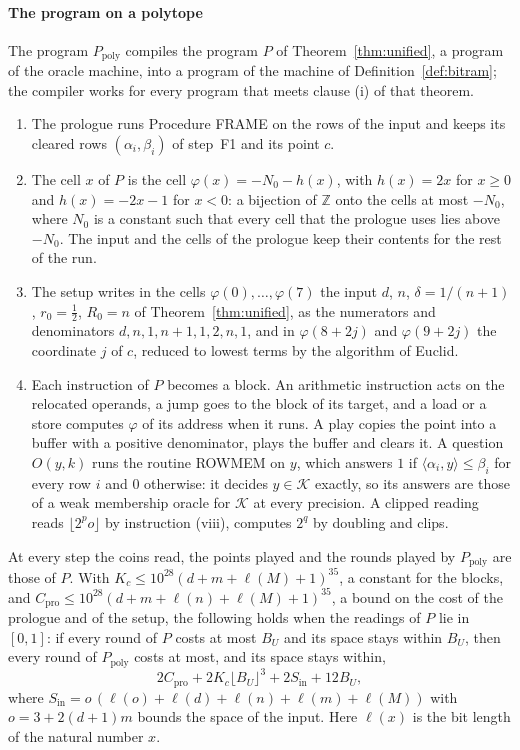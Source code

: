 \documentclass[11pt]{amsart}
\theoremstyle{definition}
\numberwithin{equation}{section}
\newcommand{\cK}{\mathcal{K}}
\newcommand{\ip}[1]{\langle #1\rangle}
\begin{document}
\paragraph{The program on a polytope} The program $P_{\mathrm{poly}}$ compiles the program $P$ of Theorem~\ref{thm:unified}, a program of the oracle machine, into a program of the machine of Definition~\ref{def:bitram}; the compiler works for every program that meets clause (i) of that theorem.
\begin{enumerate}[label=C\arabic*.,leftmargin=2.5em]
\item The prologue runs Procedure FRAME on the rows of the input and keeps its cleared rows $(\alpha_i,\beta_i)$ of step~F1 and its point $c$.
\item The cell $x$ of $P$ is the cell $\varphi(x)=-N_0-h(x)$, with $h(x)=2x$ for $x\ge0$ and $h(x)=-2x-1$ for $x<0$: a bijection of $\mathbb Z$ onto the cells at most $-N_0$, where $N_0$ is a constant such that every cell that the prologue uses lies above $-N_0$. The input and the cells of the prologue keep their contents for the rest of the run.
\item The setup writes in the cells $\varphi(0),\dots,\varphi(7)$ the input $d$, $n$, $\delta=1/(n+1)$, $r_0=\frac12$, $R_0=n$ of Theorem~\ref{thm:unified}, as the numerators and denominators $d,n,1,n+1,1,2,n,1$, and in $\varphi(8+2j)$ and $\varphi(9+2j)$ the coordinate $j$ of $c$, reduced to lowest terms by the algorithm of Euclid.
\item Each instruction of $P$ becomes a block. An arithmetic instruction acts on the relocated operands, a jump goes to the block of its target, and a load or a store computes $\varphi$ of its address when it runs. A play copies the point into a buffer with a positive denominator, plays the buffer and clears it. A question $O(y,k)$ runs the routine ROWMEM on $y$, which answers $1$ if $\ip{\alpha_i,y}\le\beta_i$ for every row $i$ and $0$ otherwise: it decides $y\in\cK$ exactly, so its answers are those of a weak membership oracle for $\cK$ at every precision. A clipped reading reads $\lfloor2^po\rfloor$ by instruction (viii), computes $2^q$ by doubling and clips.
\end{enumerate}
At every step the coins read, the points played and the rounds played by $P_{\mathrm{poly}}$ are those of $P$. With $K_c\le10^{28}(d+m+\ell(M)+1)^{35}$, a constant for the blocks, and $C_{\mathrm{pro}}\le10^{28}(d+m+\ell(n)+\ell(M)+1)^{35}$, a bound on the cost of the prologue and of the setup, the following holds when the readings of $P$ lie in $[0,1]$: if every round of $P$ costs at most $B_U$ and its space stays within $B_U$, then every round of $P_{\mathrm{poly}}$ costs at most, and its space stays within,
\[
2C_{\mathrm{pro}}+2K_c\lfloor B_U\rfloor^3+2S_{\mathrm{in}}+12B_U ,
\]
where $S_{\mathrm{in}}=o\,(\ell(o)+\ell(d)+\ell(n)+\ell(m)+\ell(M))$ with $o=3+2(d+1)m$ bounds the space of the input. Here $\ell(x)$ is the bit length of the natural number $x$.
\end{document}
